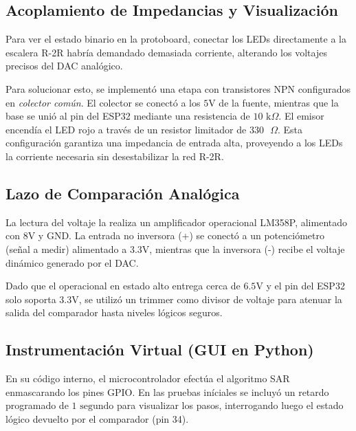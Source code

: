 \documentclass[conference]{IEEEtran}
\begin{document}
\subsection{Acoplamiento de Impedancias y Visualización}
Para ver el estado binario en la protoboard, conectar los LEDs directamente a la escalera R-2R habría demandado demasiada corriente, alterando los voltajes precisos del DAC analógico. 

Para solucionar esto, se implementó una etapa con transistores NPN configurados en \textit{colector común}. El colector se conectó a los $5\text{V}$ de la fuente, mientras que la base se unió al pin del ESP32 mediante una resistencia de $10\text{ k}\Omega$. El emisor encendía el LED rojo a través de un resistor limitador de $330\text{ }\Omega$. Esta configuración garantiza una impedancia de entrada alta, proveyendo a los LEDs la corriente necesaria sin desestabilizar la red R-2R.

\subsection{Lazo de Comparación Analógica}
La lectura del voltaje la realiza un amplificador operacional LM358P, alimentado con $8\text{V}$ y GND. La entrada no inversora (+) se conectó a un potenciómetro (señal a medir) alimentado a $3.3\text{V}$, mientras que la inversora (-) recibe el voltaje dinámico generado por el DAC. 

Dado que el operacional en estado alto entrega cerca de $6.5\text{V}$ y el pin del ESP32 solo soporta $3.3\text{V}$, se utilizó un trimmer como divisor de voltaje para atenuar la salida del comparador hasta niveles lógicos seguros.

\subsection{Instrumentación Virtual (GUI en Python)}
En su código interno, el microcontrolador efectúa el algoritmo SAR enmascarando los pines GPIO. En las pruebas iníciales se incluyó un retardo programado de $1\text{ segundo}$ para visualizar los pasos, interrogando luego el estado lógico devuelto por el comparador (pin 34). 
\end{document}
